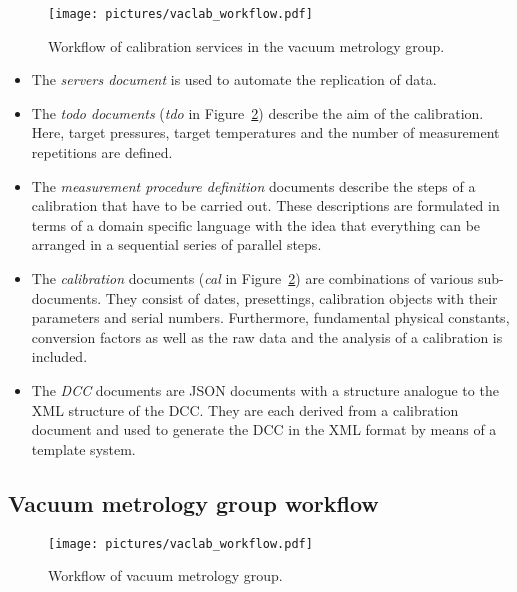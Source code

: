 \documentclass[3p,times,procedia]{elsarticle}
\begin{document}
\begin{figure}
    \centering
    \texttt{[image: pictures/vaclab\_workflow.pdf]}
    \caption{Workflow of calibration services in the vacuum metrology group. }
    \label{fig:vl-work}
\end{figure}

\begin{itemize}
  \item The \emph{servers document} is used to automate the
    replication of data.
  \item The \emph{todo documents} (\emph{tdo} in
    Figure~\ref{fig:vl-work}) describe the aim of the
    calibration. Here, target pressures, target temperatures and the
    number of measurement repetitions are defined.
  \item The \emph{measurement procedure definition} documents describe
    the steps of a calibration that have to be carried out. These
    descriptions are formulated in terms of a domain specific language
    with the idea that everything can be arranged in a sequential
    series of parallel steps.
  \item The \emph{calibration} documents (\emph{cal} in
    Figure~\ref{fig:vl-work}) are combinations of various
    sub-documents. They consist of dates, presettings, calibration
    objects with their parameters and serial numbers. Furthermore,
    fundamental physical constants, conversion factors as well as the raw data and
    the analysis of a calibration
    is included.
    \item The \emph{DCC} documents are JSON documents with a structure
      analogue to the XML structure of the DCC. They are each derived
      from a calibration document and used to generate the DCC in the
      XML format by means of a template system.
  \end{itemize}

\subsection{Vacuum metrology group workflow}
\label{ssec:vl-work}

\begin{figure}
    \centering
    \texttt{[image: pictures/vaclab\_workflow.pdf]}
    \caption{Workflow of vacuum metrology group. }
    \label{fig:vl-work}
\end{figure}
\end{document}

